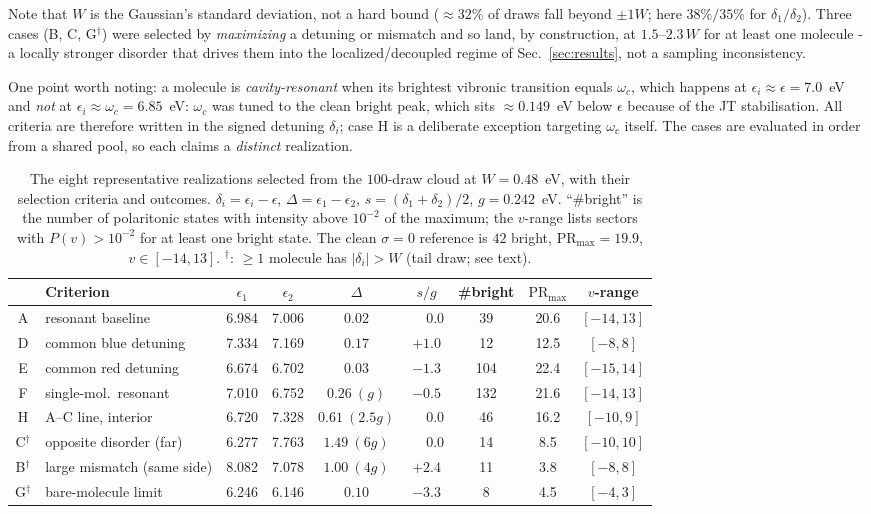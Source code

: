\documentclass[12pt,a4paper]{article}
\newcommand{\PR}{\mathrm{PR}}
\begin{document}
Note that $W$ is the Gaussian's standard deviation, not a hard bound
($\approx32\%$ of draws fall beyond $\pm1W$; here $38\%/35\%$ for
$\delta_1/\delta_2$). Three cases (B, C, G$^\dagger$) were selected by
\emph{maximizing} a detuning or mismatch and so land, by construction, at
$1.5$--$2.3\,W$ for at least one molecule - a locally stronger disorder
that drives them into the localized/decoupled regime of
Sec.~\ref{sec:results}, not a sampling inconsistency.

One point worth noting: a molecule is
\emph{cavity-resonant} when its brightest vibronic transition equals
$\omega_c$, which happens at $\epsilon_i\approx\epsilon=7.0$~eV and \emph{not}
at $\epsilon_i\approx\omega_c=6.85$~eV: $\omega_c$ was tuned to the clean
bright peak, which sits $\approx0.149$~eV below $\epsilon$ because of the JT
stabilisation. All criteria are therefore written in the signed detuning
$\delta_i$; case H is a deliberate exception targeting $\omega_c$ itself. The
cases are evaluated in order from a shared pool, so each claims a
\emph{distinct} realization.

\begin{table}[t]
\centering
\caption{The eight representative realizations selected from the $100$-draw
cloud at $W=0.48$~eV, with their selection criteria and outcomes.
$\delta_i=\epsilon_i-\epsilon$, $\Delta=\epsilon_1-\epsilon_2$,
$s=(\delta_1+\delta_2)/2$, $g=0.242$~eV. ``\#bright'' is the number of
polaritonic states with intensity above $10^{-2}$ of the maximum; the
$v$-range lists sectors with $P(v)>10^{-2}$ for at least one bright state.
The clean $\sigma=0$ reference is $42$ bright, $\PR_{\max}=19.9$,
$v\in[-14,13]$. $^\dagger$: $\ge\!1$ molecule has $|\delta_i|>W$ (tail draw; see text).}
\label{tab:cases}
\small
\setlength{\tabcolsep}{3.2pt}
\begin{tabular}{@{}clccccccc@{}}
\toprule
 & Criterion & $\epsilon_1$ & $\epsilon_2$ & $\Delta$ & $s/g$ &
 \#bright & $\PR_{\max}$ & $v$-range\\
\midrule
A & resonant baseline      & 6.984 & 7.006 & $0.02$ & $\phantom{-}0.0$ & 39 & 20.6 & $[-14,13]$\\
D & common blue detuning   & 7.334 & 7.169 & $0.17$ & $+1.0$ & 12 & 12.5 & $[-8,8]$\\
E & common red detuning    & 6.674 & 6.702 & $0.03$ & $-1.3$ & 104 & 22.4 & $[-15,14]$\\
F & single-mol.\ resonant  & 7.010 & 6.752 & $0.26\ (g)$ & $-0.5$ & 132 & 21.6 & $[-14,13]$\\
H & A--C line, interior    & 6.720 & 7.328 & $0.61\ (2.5g)$ & $\phantom{-}0.0$ & 46 & 16.2 & $[-10,9]$\\
C$^\dagger$ & opposite disorder (far)& 6.277 & 7.763 & $1.49\ (6g)$ & $\phantom{-}0.0$ & 14 & 8.5 & $[-10,10]$\\
B$^\dagger$ & large mismatch (same side) & 8.082 & 7.078 & $1.00\ (4g)$ & $+2.4$ & 11 & 3.8 & $[-8,8]$\\
G$^\dagger$ & bare-molecule limit    & 6.246 & 6.146 & $0.10$ & $-3.3$ & \phantom{0}8 & 4.5 & $[-4,3]$\\
\bottomrule
\end{tabular}
\end{table}
\end{document}
